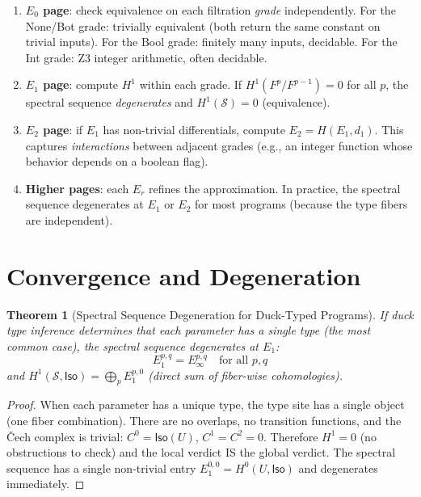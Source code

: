 \documentclass[11pt,a4paper]{report}
\theoremstyle{definition}
\theoremstyle{plain}
\newtheorem{theorem}[definition]{Theorem}
\newcommand{\Iso}{\mathsf{Iso}}
\newcommand{\Hone}{H^1}
\newcommand{\site}{\mathcal{S}}
\begin{document}
\begin{enumerate}
  \item \textbf{$E_0$ page}: check equivalence on each filtration
    \emph{grade} independently.  For the None/Bot grade: trivially
    equivalent (both return the same constant on trivial inputs).
    For the Bool grade: finitely many inputs, decidable.
    For the Int grade: Z3 integer arithmetic, often decidable.

  \item \textbf{$E_1$ page}: compute $\Hone$ within each grade.
    If $\Hone(F^p / F^{p-1}) = 0$ for all $p$, the spectral
    sequence \emph{degenerates} and $\Hone(\site) = 0$ (equivalence).

  \item \textbf{$E_2$ page}: if $E_1$ has non-trivial differentials,
    compute $E_2 = H(E_1, d_1)$.  This captures \emph{interactions}
    between adjacent grades (e.g., an integer function whose behavior
    depends on a boolean flag).

  \item \textbf{Higher pages}: each $E_r$ refines the approximation.
    In practice, the spectral sequence degenerates at $E_1$ or $E_2$
    for most programs (because the type fibers are independent).
\end{enumerate}

\section{Convergence and Degeneration}

\begin{theorem}[Spectral Sequence Degeneration for Duck-Typed Programs]
\label{thm:degeneration}
If duck type inference determines that each parameter has a
\emph{single} type (the most common case), the spectral sequence
degenerates at $E_1$:
\[
  E_1^{p,q} = E_\infty^{p,q} \quad \text{for all $p, q$}
\]
and $\Hone(\site, \Iso) = \bigoplus_p E_1^{p,0}$ (direct sum of
fiber-wise cohomologies).
\end{theorem}

\begin{proof}
When each parameter has a unique type, the type site has a single
object (one fiber combination).  There are no overlaps, no transition
functions, and the \v{C}ech complex is trivial: $C^0 = \Iso(U)$,
$C^1 = C^2 = 0$.  Therefore $\Hone = 0$ (no obstructions to check)
and the local verdict IS the global verdict.  The spectral sequence
has a single non-trivial entry $E_1^{0,0} = H^0(U, \Iso)$ and
degenerates immediately.
\end{proof}
\end{document}
